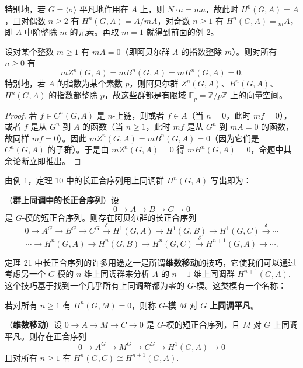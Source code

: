 特别地，若 \(G = \langle\sigma\rangle\) 平凡地作用在 \(A\) 上，则 \(N \cdot a = ma\)，故此时 \(H^0(G, A) = A\)，且对偶数 \(n \geq 2\) 有 \(H^n(G, A) = A/mA\)，对奇数 \(n \geq 1\) 有 \(H^n(G, A) = {}_mA\)，即 \(A\) 中阶整除 \(m\) 的元素。再取 \(m = 1\) 就得到前面的例 2。

\begin{proposition}\label{pro:17.20}
设对某个整数 \(m \geq 1\) 有 \(mA = 0\)（即阿贝尔群 \(A\) 的指数整除 \(m\)）。则对所有 \(n \geq 0\) 有
\[
mZ^n(G, A) = mB^n(G, A) = mH^n(G, A) = 0.
\]
特别地，若 \(A\) 的指数为某个素数 \(p\)，则阿贝尔群 \(Z^n(G, A)\)、\(B^n(G, A)\)、\(H^n(G, A)\) 的指数都整除 \(p\)，故这些群都是有限域 \(\mathbb{F}_p = \mathbb{Z}/p\mathbb{Z}\) 上的向量空间。
\end{proposition}

\begin{proof}
若 \(f \in C^n(G, A)\) 是 \(n\)-上链，则或者 \(f \in A\)（当 \(n = 0\)，此时 \(mf = 0\)），或者 \(f\) 是从 \(G^n\) 到 \(A\) 的函数（当 \(n \geq 1\)，此时 \(mf\) 是从 \(G^n\) 到 \(mA = 0\) 的函数，故同样 \(mf = 0\)）。因此 \(mZ^n(G, A) = mB^n(G, A) = 0\)（因为它们是 \(C^n(G, A)\) 的子群）。于是由 \(mZ^n(G, A) = 0\) 得 \(mH^n(G, A) = 0\)，命题中其余论断立即推出。
\end{proof}

由例 1，定理 10 中的长正合序列用上同调群 \(H^n(G, A)\) 写出即为：

\begin{theorem}\label{thm:17.21}
（\textbf{群上同调中的长正合序列}）设
\[
0 \to A \to B \to C \to 0
\]
是 \(G\)-模的短正合序列。则存在阿贝尔群的长正合序列
\[
0 \to A^G \to B^G \to C^G \xrightarrow{\delta} H^1(G, A) \to H^1(G, B) \to H^1(G, C) \xrightarrow{\delta} \cdots
\]
\[
\cdots \to H^n(G, A) \to H^n(G, B) \to H^n(G, C) \xrightarrow{\delta} H^{n+1}(G, A) \to \cdots.
\]
\end{theorem}

定理 21 中长正合序列的许多用途之一是所谓\textbf{维数移动}的技巧，它使我们可以通过考虑另一个 \(G\)-模的 \(n\) 维上同调群来分析 \(A\) 的 \(n+1\) 维上同调群 \(H^{n+1}(G, A)\). 这个技巧基于找到一个几乎所有上同调群都为零的 \(G\)-模。这类模有一个名称：

\begin{definition}
若对所有 \(n \geq 1\) 有 \(H^n(G, M) = 0\)，则称 \(G\)-模 \(M\) 对 \(G\) \textbf{上同调平凡}。
\end{definition}

\begin{corollary}\label{cor:17.22}
（\textbf{维数移动}）设 \(0 \to A \to M \to C \to 0\) 是 \(G\)-模的短正合序列，且 \(M\) 对 \(G\) 上同调平凡。则存在正合序列
\[
0 \to A^G \to M^G \to C^G \to H^1(G, A) \to 0
\]
且对所有 \(n \geq 1\) 有 \(H^n(G, C) \cong H^{n+1}(G, A)\).
\end{corollary}

